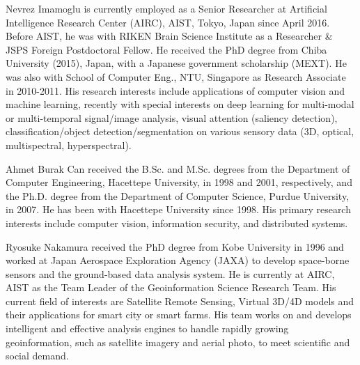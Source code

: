 \documentclass[10pt,journal,compsoc]{IEEEtran}
\begin{document}
\begin{IEEEbiographynophoto}{Nevrez Imamoglu}
is currently employed as a Senior Researcher at Artificial Intelligence Research Center (AIRC), AIST, Tokyo, Japan since April 2016. Before AIST, he was with RIKEN Brain Science Institute as a Researcher \& JSPS Foreign Postdoctoral Fellow. He received the PhD degree from Chiba University (2015), Japan, with a Japanese government scholarship (MEXT). He was also with School of Computer Eng., NTU, Singapore as Research Associate in 2010-2011. His research interests include applications of computer vision and machine learning, recently with special interests on deep learning for multi-modal or multi-temporal signal/image analysis, visual attention (saliency detection), classification/object detection/segmentation on various sensory data (3D, optical, multispectral, hyperspectral).
\end{IEEEbiographynophoto}



\begin{IEEEbiographynophoto}{Ahmet Burak Can}
received the B.Sc. and M.Sc. degrees from the Department of Computer Engineering, Hacettepe University, in 1998 and 2001, respectively, and the Ph.D. degree from the Department of Computer Science, Purdue University, in 2007. He has been with Hacettepe University since 1998. His primary research interests include computer vision, information security, and distributed systems.
\end{IEEEbiographynophoto}

\begin{IEEEbiographynophoto}{Ryosuke Nakamura}
received the PhD degree from Kobe University in 1996 and worked at Japan Aerospace Exploration Agency (JAXA) to develop space-borne sensors and the ground-based data analysis system. He is currently at AIRC, AIST as the Team Leader of the Geoinformation Science Research Team. His current field of interests are Satellite Remote Sensing, Virtual 3D/4D models and their applications for smart city or smart farms. His team works on and develops intelligent and effective analysis engines to handle rapidly growing geoinformation, such as satellite imagery and aerial photo, to meet scientific and social demand.
\end{IEEEbiographynophoto}
 
\end{document}
